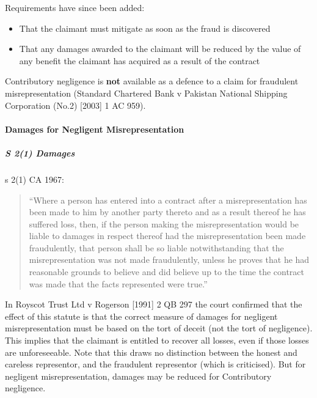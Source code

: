 \documentclass[
]{article}
\providecommand{\tightlist}{%
  \setlength{\itemsep}{0pt}\setlength{\parskip}{0pt}}
\begin{document}
Requirements have since been added:

\begin{itemize}
\tightlist
\item
  That the claimant must mitigate as soon as the fraud is discovered
\item
  That any damages awarded to the claimant will be reduced by the value
  of any benefit the claimant has acquired as a result of the contract
\end{itemize}

Contributory negligence is \textbf{not} available as a defence to a
claim for fraudulent misrepresentation (Standard Chartered Bank v
Pakistan National Shipping Corporation (No.2) {[}2003{]} 1 AC 959).

\hypertarget{damages-for-negligent-misrepresentation}{%
\paragraph{Damages for Negligent
Misrepresentation}\label{damages-for-negligent-misrepresentation}}

\hypertarget{s-21-damages}{%
\subparagraph{S 2(1) Damages}\label{s-21-damages}}

s 2(1) CA 1967:

\begin{quote}
``Where a person has entered into a contract after a misrepresentation
has been made to him by another party thereto and as a result thereof he
has suffered loss, then, if the person making the misrepresentation
would be liable to damages in respect thereof had the misrepresentation
been made fraudulently, that person shall be so liable notwithstanding
that the misrepresentation was not made fraudulently, unless he proves
that he had reasonable grounds to believe and did believe up to the time
the contract was made that the facts represented were true.''
\end{quote}

In Royscot Trust Ltd v Rogerson {[}1991{]} 2 QB 297 the court confirmed
that the effect of this statute is that the correct measure of damages
for negligent misrepresentation must be based on the tort of deceit (not
the tort of negligence). This implies that the claimant is entitled to
recover all losses, even if those losses are unforeseeable. Note that
this draws no distinction between the honest and careless representor,
and the fraudulent representor (which is criticised). But for negligent
misrepresentation, damages may be reduced for Contributory negligence.
\end{document}
